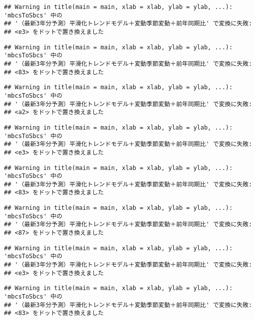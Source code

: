 \documentclass[]{article}
\begin{document}
\begin{verbatim}
## Warning in title(main = main, xlab = xlab, ylab = ylab, ...): 'mbcsToSbcs' 中の
## '（最新3年分予測）平滑化トレンドモデル＋変動季節変動＋前年同期比' で変換に失敗:
## <e3> をドットで置き換えました
\end{verbatim}

\begin{verbatim}
## Warning in title(main = main, xlab = xlab, ylab = ylab, ...): 'mbcsToSbcs' 中の
## '（最新3年分予測）平滑化トレンドモデル＋変動季節変動＋前年同期比' で変換に失敗:
## <83> をドットで置き換えました
\end{verbatim}

\begin{verbatim}
## Warning in title(main = main, xlab = xlab, ylab = ylab, ...): 'mbcsToSbcs' 中の
## '（最新3年分予測）平滑化トレンドモデル＋変動季節変動＋前年同期比' で変換に失敗:
## <a2> をドットで置き換えました
\end{verbatim}

\begin{verbatim}
## Warning in title(main = main, xlab = xlab, ylab = ylab, ...): 'mbcsToSbcs' 中の
## '（最新3年分予測）平滑化トレンドモデル＋変動季節変動＋前年同期比' で変換に失敗:
## <e3> をドットで置き換えました
\end{verbatim}

\begin{verbatim}
## Warning in title(main = main, xlab = xlab, ylab = ylab, ...): 'mbcsToSbcs' 中の
## '（最新3年分予測）平滑化トレンドモデル＋変動季節変動＋前年同期比' で変換に失敗:
## <83> をドットで置き換えました
\end{verbatim}

\begin{verbatim}
## Warning in title(main = main, xlab = xlab, ylab = ylab, ...): 'mbcsToSbcs' 中の
## '（最新3年分予測）平滑化トレンドモデル＋変動季節変動＋前年同期比' で変換に失敗:
## <87> をドットで置き換えました
\end{verbatim}

\begin{verbatim}
## Warning in title(main = main, xlab = xlab, ylab = ylab, ...): 'mbcsToSbcs' 中の
## '（最新3年分予測）平滑化トレンドモデル＋変動季節変動＋前年同期比' で変換に失敗:
## <e3> をドットで置き換えました
\end{verbatim}

\begin{verbatim}
## Warning in title(main = main, xlab = xlab, ylab = ylab, ...): 'mbcsToSbcs' 中の
## '（最新3年分予測）平滑化トレンドモデル＋変動季節変動＋前年同期比' で変換に失敗:
## <83> をドットで置き換えました
\end{verbatim}
\end{document}
